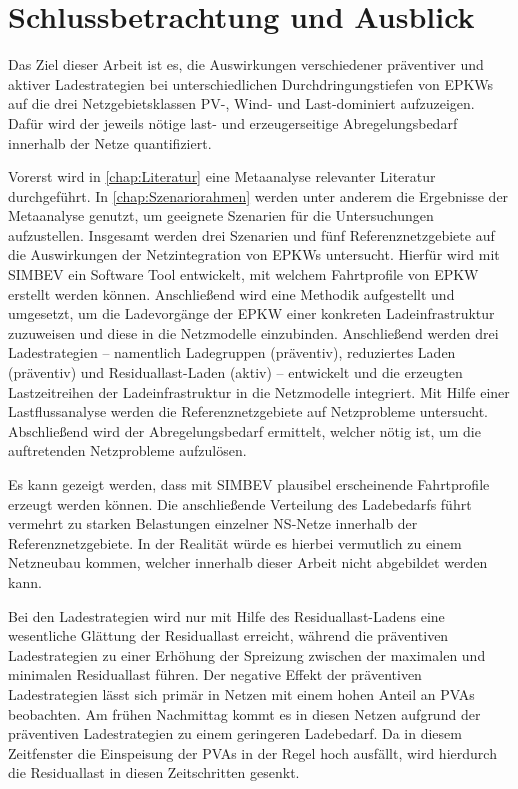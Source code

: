 \section{Schlussbetrachtung und Ausblick}\label{chap:schlussbetrachtung}

Das Ziel dieser Arbeit ist es, die Auswirkungen verschiedener präventiver und aktiver Ladestrategien bei unterschiedlichen Durchdringungstiefen von \glspl{EPKW} auf die drei Netzgebietsklassen \gls{PV}-, Wind- und Last-dominiert aufzuzeigen.
Dafür wird der jeweils nötige last- und erzeugerseitige Abregelungsbedarf innerhalb der Netze quantifiziert.\medskip

Vorerst wird in \autoref{chap:Literatur} eine Metaanalyse relevanter Literatur durchgeführt.
In \autoref{chap:Szenariorahmen} werden unter anderem die Ergebnisse der Metaanalyse genutzt, um geeignete Szenarien für die Untersuchungen aufzustellen.
Insgesamt werden drei Szenarien und fünf Referenznetzgebiete auf die Auswirkungen der Netzintegration von \glspl{EPKW} untersucht.
Hierfür wird mit \gls{SIMBEV} ein Software Tool entwickelt, mit welchem Fahrtprofile von \gls{EPKW} erstellt werden können.
Anschließend wird eine Methodik aufgestellt und umgesetzt, um die Ladevorgänge der \gls{EPKW} einer konkreten Ladeinfrastruktur zuzuweisen und diese in die Netzmodelle einzubinden.
Anschließend werden drei Ladestrategien {--} namentlich Ladegruppen (präventiv), reduziertes Laden (präventiv) und Residuallast-Laden (aktiv) {--} entwickelt und die erzeugten Lastzeitreihen der Ladeinfrastruktur in die Netzmodelle integriert.
Mit Hilfe einer Lastflussanalyse werden die Referenznetzgebiete auf Netzprobleme untersucht.
Abschließend wird der Abregelungsbedarf ermittelt, welcher nötig ist, um die auftretenden Netzprobleme aufzulösen.\medskip

Es kann gezeigt werden, dass mit \gls{SIMBEV} plausibel erscheinende Fahrtprofile erzeugt werden können.
Die anschließende Verteilung des Ladebedarfs führt vermehrt zu starken Belastungen einzelner \gls{NS}-Netze innerhalb der Referenznetzgebiete.
In der Realität würde es hierbei vermutlich zu einem Netzneubau kommen, welcher innerhalb dieser Arbeit nicht abgebildet werden kann.\medskip

Bei den Ladestrategien wird nur mit Hilfe des Residuallast-Ladens eine wesentliche Glättung der Residuallast erreicht, während die präventiven Ladestrategien zu einer Erhöhung der Spreizung zwischen der maximalen und minimalen Residuallast führen.
Der negative Effekt der präventiven Ladestrategien lässt sich primär in Netzen mit einem hohen Anteil an \glspl{PVA} beobachten.
Am frühen Nachmittag kommt es in diesen Netzen aufgrund der präventiven Ladestrategien zu einem geringeren Ladebedarf.
Da in diesem Zeitfenster die Einspeisung der \glspl{PVA} in der Regel hoch ausfällt, wird hierdurch die Residuallast in diesen Zeitschritten gesenkt.\medskip


